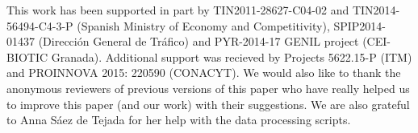 \documentclass[journal,onecolumn]{IEEEtran}
\begin{document}
This work has been supported in part by TIN2011-28627-C04-02 and
TIN2014-56494-C4-3-P (Spanish Ministry of Economy and Competitivity),
SPIP2014-01437 (Direcci{\'o}n General de Tr{\'a}fico) and PYR-2014-17
GENIL project (CEI-BIOTIC Granada). Additional support was recieved by
Projects 5622.15-P (ITM) and  PROINNOVA 2015: 220590 (CONACYT).
We would also like to thank the
anonymous reviewers of previous versions of this paper who have really
helped us to improve 
this paper (and our work) with their suggestions. We are also grateful
to Anna S\'aez de Tejada for her help with the data processing scripts.



\end{document}
